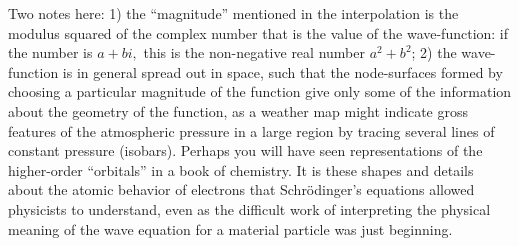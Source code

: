 Two notes here: 1) the ``magnitude'' mentioned in the interpolation is the modulus squared
of the complex number that is the value of the wave-function: if the number is $a + bi,$
this is the non-negative real number $a^2 + b^2$; 2) the wave-function is in general spread
out in space, such that the node-surfaces formed by choosing a particular magnitude of the
function give only some of the information about the geometry of the function, as a
weather map might indicate gross features of the atmospheric pressure in a large region 
by tracing several lines of constant pressure (isobars). Perhaps you will have seen
representations of the higher-order ``orbitals'' in a book of chemistry. It is these 
shapes and details about the atomic behavior of electrons that Schrödinger's equations
allowed physicists to understand, even as the difficult work of interpreting the
physical meaning of the wave equation for a material particle was just beginning.
 
